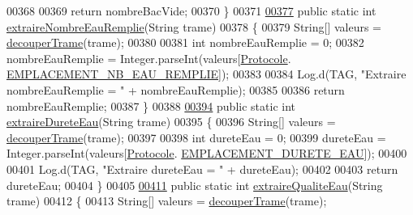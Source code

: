 \begin{DoxyCode}
00368 
00369         \textcolor{keywordflow}{return} nombreBacVide;
00370     \}
00371 
\hyperlink{classcom_1_1example_1_1ekawa_1_1_protocole_ae4aa9859ca0f359284c931e31732477f}{00377}     \textcolor{keyword}{public} \textcolor{keyword}{static} \textcolor{keywordtype}{int} \hyperlink{classcom_1_1example_1_1ekawa_1_1_protocole_ae4aa9859ca0f359284c931e31732477f}{extraireNombreEauRemplie}(String trame)
00378     \{
00379         String[] valeurs = \hyperlink{classcom_1_1example_1_1ekawa_1_1_protocole_a23c261e4ab5ad3c2ac60187f04ae40ea}{decouperTrame}(trame);
00380 
00381         \textcolor{keywordtype}{int} nombreEauRemplie = 0;
00382         nombreEauRemplie = Integer.parseInt(valeurs[\hyperlink{classcom_1_1example_1_1ekawa_1_1_protocole}{Protocole}.
      \hyperlink{classcom_1_1example_1_1ekawa_1_1_protocole_a3c7e43fc0589bd18f2e4631c509cbb59}{EMPLACEMENT\_NB\_EAU\_REMPLIE}]);
00383 
00384         Log.d(TAG, \textcolor{stringliteral}{"Extraire nombreEauRemplie = "} + nombreEauRemplie);
00385 
00386         \textcolor{keywordflow}{return} nombreEauRemplie;
00387     \}
00388 
\hyperlink{classcom_1_1example_1_1ekawa_1_1_protocole_a3d092fccea3a5bf3a92810dbe90603b0}{00394}     \textcolor{keyword}{public} \textcolor{keyword}{static} \textcolor{keywordtype}{int} \hyperlink{classcom_1_1example_1_1ekawa_1_1_protocole_a3d092fccea3a5bf3a92810dbe90603b0}{extraireDureteEau}(String trame)
00395     \{
00396         String[] valeurs = \hyperlink{classcom_1_1example_1_1ekawa_1_1_protocole_a23c261e4ab5ad3c2ac60187f04ae40ea}{decouperTrame}(trame);
00397 
00398         \textcolor{keywordtype}{int} dureteEau = 0;
00399         dureteEau = Integer.parseInt(valeurs[\hyperlink{classcom_1_1example_1_1ekawa_1_1_protocole}{Protocole}.
      \hyperlink{classcom_1_1example_1_1ekawa_1_1_protocole_a9345f9120d147cf525afc440f4746129}{EMPLACEMENT\_DURETE\_EAU}]);
00400 
00401         Log.d(TAG, \textcolor{stringliteral}{"Extraire dureteEau = "} + dureteEau);
00402 
00403         \textcolor{keywordflow}{return} dureteEau;
00404     \}
00405 
\hyperlink{classcom_1_1example_1_1ekawa_1_1_protocole_a8f7c96aaa3fad76354e1cb4665c85e57}{00411}     \textcolor{keyword}{public} \textcolor{keyword}{static} \textcolor{keywordtype}{int} \hyperlink{classcom_1_1example_1_1ekawa_1_1_protocole_a8f7c96aaa3fad76354e1cb4665c85e57}{extraireQualiteEau}(String trame)
00412     \{
00413         String[] valeurs = \hyperlink{classcom_1_1example_1_1ekawa_1_1_protocole_a23c261e4ab5ad3c2ac60187f04ae40ea}{decouperTrame}(trame);

\end{DoxyCode}
